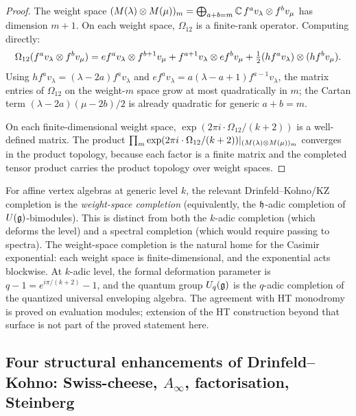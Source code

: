 \begin{proof}
The weight space $(M(\lambda) \otimes M(\mu))_m = \bigoplus_{a+b=m} \mathbb C\,f^a v_\lambda \otimes f^b v_\mu$ has dimension $m+1$. On each weight space, $\Omega_{12}$ is a finite-rank operator. Computing directly:
\[
 \Omega_{12}(f^a v_\lambda \otimes f^b v_\mu)
 = e f^a v_\lambda \otimes f^{b+1} v_\mu + f^{a+1} v_\lambda \otimes e f^b v_\mu
 + \tfrac{1}{2}(h f^a v_\lambda) \otimes (h f^b v_\mu).
\]
Using $h f^a v_\lambda = (\lambda - 2a) f^a v_\lambda$ and $e f^a v_\lambda = a(\lambda - a + 1) f^{a-1} v_\lambda$, the matrix entries of $\Omega_{12}$ on the weight-$m$ space grow at most quadratically in $m$; the Cartan term
$(\lambda - 2a)(\mu - 2b)/2$ is already quadratic for generic
$a+b=m$.

On each finite-dimensional weight space, $\exp(2\pi i \cdot \Omega_{12}/(k+2))$ is a well-defined matrix. The product $\prod_m \exp(2\pi i \cdot \Omega_{12}/(k+2))|_{(M(\lambda) \otimes M(\mu))_m}$ converges in the product topology, because each factor is a finite matrix and the completed tensor product carries the product topology over weight spaces.
\end{proof}

\begin{remark}
\label{rem:completion-type}
For affine vertex algebras at generic level $k$, the relevant
Drinfeld--Kohno/KZ completion is the \emph{weight-space completion}
(equivalently, the $\mathfrak{h}$-adic completion of $U(\mathfrak{g})$-bimodules). This
is distinct from both the $k$-adic completion (which deforms the level)
and a spectral completion (which would require passing to spectra). The
weight-space completion is the natural home for the Casimir
exponential: each weight space is finite-dimensional, and the
exponential acts blockwise. At $k$-adic level, the formal deformation
parameter is $q - 1 = e^{i\pi/(k+2)} - 1$, and the quantum group
$U_q(\mathfrak{g})$ is the $q$-adic completion of the quantized universal
enveloping algebra. The agreement with HT monodromy is proved on
evaluation modules; extension of the HT construction beyond that
surface is not part of the proved statement here.
\end{remark}

\subsection{Four structural enhancements of Drinfeld--Kohno: Swiss-cheese, $A_\infty$, factorisation, Steinberg}
\label{subsec:beyond-dk}

